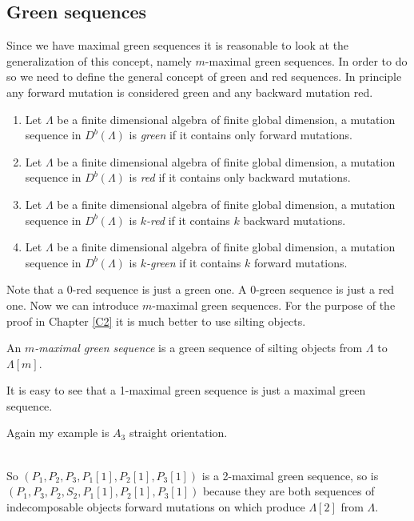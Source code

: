 \subsection{Green sequences}
\indent Since we have maximal green sequences it is reasonable to look at the generalization of this concept, namely $m$-maximal green sequences. In order to do so we need to define the general concept of green and red sequences. In principle any forward mutation is considered green and any backward mutation red.\\
\begin{definition}
\begin{enumerate}
\item Let $\Lambda$ be a finite dimensional algebra of finite global dimension, a mutation sequence in $D^b(\Lambda)$ is \textit{green} if it contains only forward mutations. 
\item Let $\Lambda$ be a finite dimensional algebra of finite global dimension, a mutation sequence in $D^b(\Lambda)$ is \textit{red} if it contains only backward mutations. 
\item Let $\Lambda$ be a finite dimensional algebra of finite global dimension, a mutation sequence in $D^b(\Lambda)$ is \textit{$k$-red} if it contains $k$ backward mutations. 
\item Let $\Lambda$ be a finite dimensional algebra of finite global dimension, a mutation sequence in $D^b(\Lambda)$ is \textit{$k$-green} if it contains $k$ forward mutations.
\end{enumerate}
\end{definition}
\indent Note that a $0$-red sequence is just a green one. A $0$-green sequence is just a red one. Now we can introduce $m$-maximal green sequences. For the purpose of the proof in Chapter \ref{C2} it is much better to use silting objects.\\
\begin{definition}
An \textit{$m$-maximal green sequence} is a green sequence of silting objects from $\Lambda$ to $\Lambda[m]$.
\end{definition}
\indent It is easy to see that a 1-maximal green sequence is just a maximal green sequence.\\
\begin{example}
\indent Again my example is $A_3$ straight orientation.\\
\\
\indent So $(P_1,P_2,P_3,P_1[1],P_2[1],P_3[1])$ is a 2-maximal green sequence, so is $(P_1,P_3,P_2,S_2,P_1[1],P_2[1],P_3[1])$ because they are both sequences of indecomposable objects forward mutations on which produce $\Lambda[2]$ from $\Lambda$. \\
\end{example}
